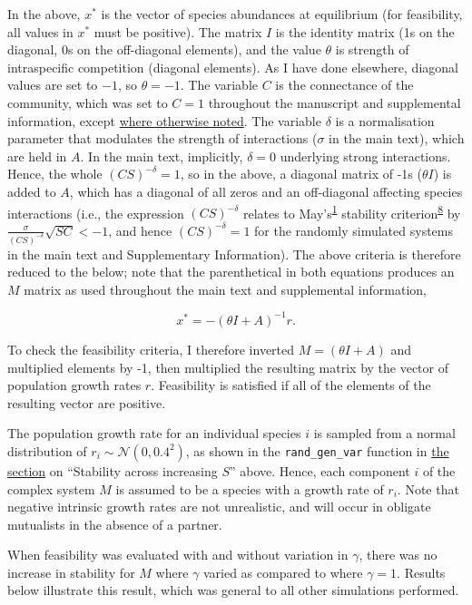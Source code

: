 \documentclass[]{article}
\begin{document}
In the above, \(x^{*}\) is the vector of species abundances at
equilibrium (for feasibility, all values in \(x^{*}\) must be positive).
The matrix \(I\) is the identity matrix (1s on the diagonal, 0s on the
off-diagonal elements), and the value \(\theta\) is strength of
intraspecific competition (diagonal elements). As I have done elsewhere,
diagonal values are set to \(-1\), so \(\theta = -1\). The variable
\(C\) is the connectance of the community,
which was set to \(C = 1\) throughout the manuscript and supplemental
information, except \protect\hyperlink{connectance}{where otherwise
noted}. The variable \(\delta\) is a normalisation parameter that
modulates the strength of interactions (\(\sigma\) in the main text),
which are held in \(A\). In the main text, implicitly, \(\delta = 0\)
underlying strong interactions. Hence, the whole \((CS)^{-\delta} = 1\),
so in the above, a diagonal matrix of -1s (\(\theta I\)) is added to
\(A\), which has a diagonal of all zeros and an off-diagonal affecting
species interactions (i.e., the expression \((CS)^{-\delta}\) relates to
May's\textsuperscript{\protect\hyperlink{ref-May1972}{1}} stability
criterion\textsuperscript{\protect\hyperlink{ref-Dougoud2018}{8}} by
\(\frac{\sigma}{(CS)^{-\delta}}\sqrt{SC} < -1\), and hence
\((CS)^{-\delta} = 1\) for the randomly simulated systems in the main
text and Supplementary Information). The above criteria is therefore
reduced to the below; note that the parenthetical in both equations
produces an \(M\) matrix as used throughout the main text and
supplemental information,

\[x^{*} = -\left(\theta I + A\right)^{-1}r.\]

To check the feasibility criteria, I therefore inverted
\(M = (\theta I + A)\) and multiplied elements by -1, then multiplied
the resulting matrix by the vector of population growth rates \(r\).
Feasibility is satisfied if all of the elements of the resulting vector
are positive.

The population growth rate for an individual species \(i\) is sampled
from a normal distribution of \(r_{i} \sim \mathcal{N}(0, 0.4^{2})\), as
shown in the \texttt{rand\_gen\_var} function in
\protect\hyperlink{IncrS}{the section} on ``Stability across increasing
\(S\)'' above. Hence, each component \(i\) of the complex system \(M\)
is assumed to be a species with a growth rate of \(r_{i}\). Note that
negative intrinsic growth rates are not unrealistic, and will occur in
obligate mutualists in the absence of a partner.

When feasibility was evaluated with and without variation in \(\gamma\),
there was no increase in stability for \(M\) where \(\gamma\) varied as
compared to where \(\gamma = 1\). Results below illustrate this result,
which was general to all other simulations performed.
\end{document}
